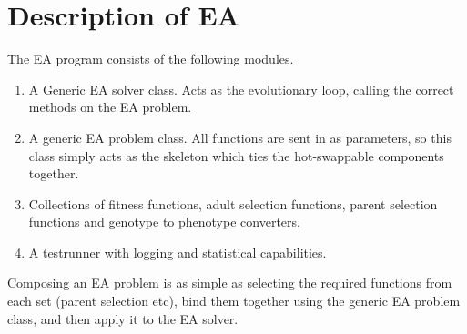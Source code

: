 \section{Description of EA}

The EA program consists of the following modules.

\begin{enumerate}
\item A Generic EA solver class. Acts as the evolutionary loop, calling the correct methods on the EA problem.
\item A generic EA problem class. All functions are sent in as parameters, so this class simply acts as the skeleton which ties the hot-swappable components together.
\item Collections of fitness functions, adult selection functions, parent selection functions and genotype to phenotype converters.
\item A testrunner with logging and statistical capabilities.
\end{enumerate}

Composing an EA problem is as simple as selecting the required functions from each set (parent selection etc), bind them together using the generic EA problem class, and then apply it to the EA solver.
